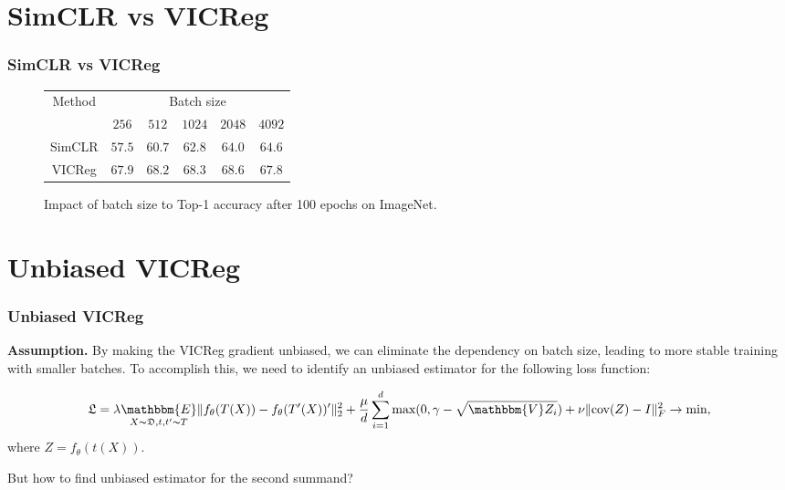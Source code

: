 \documentclass[13pt,aspectratio=169]{beamer}
\begin{document}
\section{SimCLR vs VICReg}
\begin{frame}
  \frametitle{SimCLR vs VICReg}

  \begin{figure}
    \centering
    \begin{tabular}{| c | c | c | c | c | c |}
      \hline
      \multirow{2}{*}{Method} & \multicolumn{5}{|c|}{Batch size} \\
      \cline{2-6}
      & $256$ & $512$ & $1024$ & $2048$ & $4092$ \\
      \hline
      SimCLR & $57.5$ & $60.7$ & $62.8$ & $64.0$ & $64.6$ \\
      \hline
      VICReg & $67.9$ & $68.2$ & $68.3$ & $68.6$ & $67.8$ \\
      \hline
    \end{tabular}
    \caption{Impact of batch size to Top-1 accuracy after 100 epochs on ImageNet.}
  \end{figure}
\end{frame}

\section{Unbiased VICReg}
\begin{frame}
  \frametitle{Unbiased VICReg}
  \textbf{Assumption.} By making the VICReg gradient unbiased,
  we can eliminate the dependency on batch size, 
  leading to more stable training with smaller batches.
  To accomplish this, we need to identify an unbiased estimator 
  for the following loss function:

  \begin{equation*}
    \mathfrak{L} = \lambda \underset{X \thicksim \mathfrak{D}, t, t' \thicksim T}{\mathbbm{E}} \| f_{\theta}(T(X)) - f_{\theta}(T'(X))' \|_2^2 + \frac{\mu}{d}\sum_{i=1}^{d} \text{max}(0, \gamma - \sqrt{\mathbbm{V}Z_i}) + \nu \| \text{cov}(Z) - I \|_F^2 \rightarrow \text{min},
  \end{equation*}
  where $Z = f_{\theta}(t(X))$.

  But how to find unbiased estimator for the second summand?
\end{frame}
\end{document}
